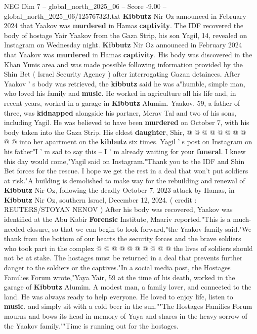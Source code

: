 \begin{textsample}{NEG Dim 7 – global\_north\_2025\_06 – Score -9.00 – global\_north\_2025\_06/125767323.txt}  \label{ex:f7_neg_073}
\textbf{Kibbutz} Nir Oz announced in February 2024 that Yaakov was \textbf{murdered} in Hamas \textbf{captivity}.
The IDF recovered the body of hostage Yair Yaakov from the Gaza Strip, his son Yagil, 14, revealed on Instagram on Wednesday night. \textbf{Kibbutz} Nir Oz announced in February 2024 that Yaakov was \textbf{murdered} in Hamas \textbf{captivity}.
His body was discovered in the Khan Yunis area and was made possible following information provided by the Shin Bet ( Israel Security Agency ) after interrogating Gazan detainees.
After Yaakov ' s body was retrieved, the \textbf{kibbutz} said he was a"humble, simple man, who loved his family and \textbf{music}.
He worked in agriculture all his life and, in recent years, worked in a garage in \textbf{Kibbutz} Alumim.
Yaakov, 59, a father of three, was \textbf{kidnapped} alongside his partner, Merav Tal and two of his sons, including Yagil.
He was believed to have been \textbf{murdered} on October 7, with his body taken into the Gaza Strip.
His eldest \textbf{daughter}, Shir, @ @ @ @ @ @ @ @ @ @ into her apartment on the \textbf{kibbutz} six times.
Yagil ' s post on Instagram on his father"I ' m sad to say this -- I ' m already waiting for your \textbf{funeral}.
I knew this day would come,"Yagil said on Instagram."Thank you to the IDF and Shin Bet forces for the rescue.
I hope we get the rest in a deal that won't put soldiers at risk."A building is demolished to make way for the rebuilding and renewal of \textbf{Kibbutz} Nir Oz, following the deadly October 7, 2023 attack by Hamas, in \textbf{Kibbutz} Nir Oz, southern Israel, December 12, 2024. ( credit : REUTERS/STOYAN NENOV ) After his body was recovered, Yaakov was identified at the Abu Kabir \textbf{Forensic} Institute, Maariv reported."This is a much-needed closure, so that we can begin to look forward,"the Yaakov family said."We thank from the bottom of our hearts the security forces and the brave soldiers who took part in the complex @ @ @ @ @ @ @ @ @ @ the lives of soldiers should not be at stake.
The hostages must be returned in a deal that prevents further danger to the soldiers or the captives."In a social media post, the Hostages Families Forum wrote,"Yaya Yair, 59 at the time of his death, worked in the garage of \textbf{Kibbutz} Alumim.
A modest man, a family lover, and connected to the land.
He was always ready to help everyone.
He loved to enjoy life, listen to \textbf{music}, and simply sit with a cold beer in the sun.""The Hostages Families Forum mourns and bows its head in memory of Yaya and shares in the heavy sorrow of the Yaakov family.""Time is running out for the hostages.

\end{textsample}
